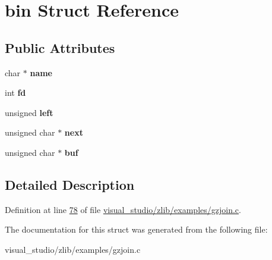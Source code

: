 \hypertarget{structbin}{}\section{bin Struct Reference}
\label{structbin}
\subsection*{Public Attributes}
\begin{DoxyCompactItemize}
\item 
\mbox{\label{structbin_af954f7daa385987c134c780325263609}} 
char $\ast$ {\bfseries name}
\item 
\mbox{\label{structbin_a56e9c344a1bef0d4be37fa6c5ff2a28d}} 
int {\bfseries fd}
\item 
\mbox{\label{structbin_af8cc95dc82b46ee02858324c439c159b}} 
unsigned {\bfseries left}
\item 
\mbox{\label{structbin_a9649eeb127ee281f071669b62daf0e55}} 
unsigned char $\ast$ {\bfseries next}
\item 
\mbox{\label{structbin_afd7f5299d84295781a1e3c6ae58e9e35}} 
unsigned char $\ast$ {\bfseries buf}
\end{DoxyCompactItemize}


\subsection{Detailed Description}


Definition at line \hyperlink{visual__studio_2zlib_2examples_2gzjoin_8c_source_l00078}{78} of file \hyperlink{visual__studio_2zlib_2examples_2gzjoin_8c_source}{visual\+\_\+studio/zlib/examples/gzjoin.\+c}.



The documentation for this struct was generated from the following file\+:\begin{DoxyCompactItemize}
\item 
visual\+\_\+studio/zlib/examples/gzjoin.\+c\end{DoxyCompactItemize}
